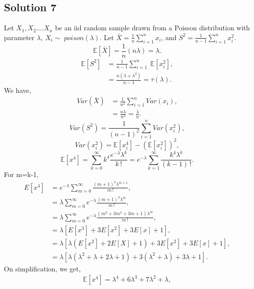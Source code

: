 \documentclass[a4paper,english,12pt]{article}
\begin{document}
\hypertarget{solution7}{\subsection*{Solution 7}}
Let $X_1,X_2....X_n$ be an iid random sample drawn from a Poisson distribution with parameter $\lambda,~X_{i}\sim\;poison(\lambda)$. Let $\bar X=\frac{1}{n}\sum_{i=1}^{n}x_{i}$, and $S^{2}=\frac{1}{n-1}\sum_{i=1}^{n}x_{i}^{2}$.
\begin{equation*}
\mathbb{E}[\bar{X}] = \frac{1}{n}(n\lambda) = \lambda.
\end{equation*}
\begin{align*}
\mathbb{E}[S^{2}] &= \frac{1}{n-1}\sum_{i=1}^{n} \;\mathbb{E}[x_{i}^{2}],\\
&=\frac{n(\lambda+\lambda^{2})}{n-1} = \tau(\lambda).
\end{align*}
We have,
\begin{align*}
Var(\bar{X})&= \frac{1}{n^{2}}
\sum_{i=1}^{n} Var(x_{i}),\\
&= \frac{n\lambda}{n^{2}} = \frac{\lambda}{n}.
\end{align*}
\begin{equation*}
Var(S^{2}) = \frac{1}{(n-1)^{2}} \sum_{i=1}^{n} Var(x_{i}^{2}),
\end{equation*}
\begin{equation*}
Var(x_{i}^{2}) = \mathbb{E}[x_{i}^{4}] - (\mathbb{E}[x_{i}^{2}])^{2},
\end{equation*}
\begin{equation*}
\mathbb{E}[x^{4}] = \sum_{k=0}^{\infty} k^{4} \frac{e^{-\lambda}\lambda^{k}}{k\,!}=e^{-\lambda}\sum_{k=1}^{\infty} \frac{k^{4}\lambda^{k}}{(k-1)\,!}.
\end{equation*}
For m=k-1,
\begin{align*}
E[x^{4}]&=e^{-\lambda}\sum_{m=0}^{\infty} \frac{(m+1)^{3}\lambda^{m+1}}{m\,!},\\
&=\lambda\sum_{m=0}^{\infty} e^{-\lambda}\frac{(m+1)^{3}\lambda^{m}}{m\,!},\\
&= \lambda\sum_{m=0}^{\infty} e^{-\lambda}\frac{(m^{3}+3m^{2}+3m+1)\lambda^{m}}{m\,!},\\
&=\lambda[E[x^{3}]+3E[x^{2}]+3E[x]+1],\\
&=\lambda[\lambda(E[x^{2}]+2E[X]+1)+3E[x^{2}]+3E[x]+1],\\
&=\lambda[\lambda(\lambda^{2}+\lambda+2\lambda+1)+3(\lambda^{2}+\lambda)+3\lambda+1].
\end{align*} 
On simplification, we get,
\begin{align*}
\mathbb{E}[x^{4}]=\lambda^{4}+6\lambda^{3}+7\lambda^{2}+\lambda,
\end{align*}
\end{document}
